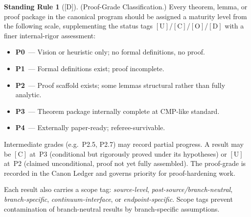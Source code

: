 \documentclass[12pt,oneside]{amsbook}
\theoremstyle{plain}
\theoremstyle{definition}
\newtheorem{standingrule}[theorem]{Standing Rule}
\theoremstyle{remark}
\newcommand{\status}[1]{\textup{[#1]}}
\begin{document}
\begin{standingrule}[\status{D}]\label{sr:proof-grade}
\textup{(Proof-Grade Classification.)}
Every theorem, lemma, or proof package in the canonical program should
be assigned a maturity level from the following scale, supplementing
the status tags $[\mathrm{U}]$/$[\mathrm{C}]$/$[\mathrm{O}]$/$[\mathrm{D}]$
with a finer internal-rigor assessment:
\begin{itemize}
  \item \textbf{P0}~--- Vision or heuristic only; no formal definitions,
    no proof.
  \item \textbf{P1}~--- Formal definitions exist; proof incomplete.
  \item \textbf{P2}~--- Proof scaffold exists; some lemmas structural
    rather than fully analytic.
  \item \textbf{P3}~--- Theorem package internally complete at
    CMP-like standard.
  \item \textbf{P4}~--- Externally paper-ready; referee-survivable.
\end{itemize}
Intermediate grades (e.g.\ P2.5, P2.7) may record partial progress.
A result may be $[\mathrm{C}]$ at~P3 (conditional but rigorously proved
under its hypotheses) or $[\mathrm{U}]$ at~P2 (claimed unconditional,
proof not yet fully assembled).  The proof-grade is recorded in the
Canon Ledger and governs priority for proof-hardening work.

Each result also carries a scope tag: \emph{source-level},
\emph{post-source/branch-neutral}, \emph{branch-specific},
\emph{continuum-interface}, or \emph{endpoint-specific}.  Scope tags
prevent contamination of branch-neutral results by branch-specific
assumptions.
\end{standingrule}
\end{document}
